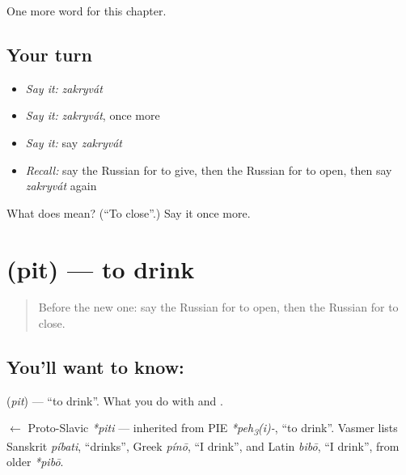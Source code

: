 \begin{grammarlens}[title={What you've built}]
One more word for this chapter.
\end{grammarlens}

\subsection*{Your turn}
\begin{itemize}
\raggedright
  \item \emph{Say it:} \emph{zakryvát}
  \item \emph{Say it:} \emph{zakryvát}, once more
  \item \emph{Say it:} say \emph{zakryvát}
  \item \emph{Recall:} say the Russian for to give, then the Russian for to open, then say \emph{zakryvát} again
\end{itemize}

\begin{tcolorbox}[breakable,colback=teal!4,colframe=teal!35!black,title={Before you move on}]
What does  mean? (\textquotedblleft{}To close\textquotedblright{}.) Say it once more.
\end{tcolorbox}
\section[\texorpdfstring{\ru{пить} (pit)}{пить (pit)}]{ (pit) — to drink}

\label{lesson:RU-C42-pit}



\begin{quote}
Before the new one: say the Russian for to open, then the Russian for to close.
\end{quote}

\subsection*{You'll want to know: }
\textbf{} (\emph{pit}) — \textquotedblleft{}to drink\textquotedblright{}. What you do with \textbf{} and \textbf{}.

\begin{cousinweb}
\textbf{} $\leftarrow$ Proto-Slavic \emph{*piti} — inherited from PIE \emph{*peh\textsubscript{3}(i)-}, \textquotedblleft{}to drink\textquotedblright{}. Vasmer lists Sanskrit \emph{píbati}, \textquotedblleft{}drinks\textquotedblright{}, Greek \emph{pínō}, \textquotedblleft{}I drink\textquotedblright{}, and Latin \emph{bibō}, \textquotedblleft{}I drink\textquotedblright{}, from older \emph{*pibō}.
\end{cousinweb}

